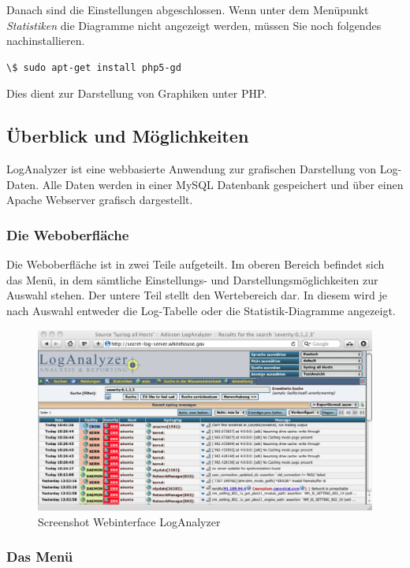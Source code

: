 Danach sind die Einstellungen abgeschlossen. Wenn unter dem Menüpunkt \textit{Statistiken} die Diagramme nicht angezeigt werden, müssen Sie noch folgendes nachinstallieren.

\begin{lstlisting}
\$ sudo apt-get install php5-gd
\end{lstlisting}

Dies dient zur Darstellung von Graphiken unter PHP.

\subsection{Überblick und Möglichkeiten}
LogAnalyzer ist eine webbasierte Anwendung zur grafischen Darstellung von Log-Daten. Alle Daten werden in einer MySQL Datenbank gespeichert und über einen Apache Webserver grafisch dargestellt.

\subsubsection{Die Weboberfläche}
Die Weboberfläche ist in zwei Teile aufgeteilt. Im oberen Bereich befindet sich das Menü, in dem sämtliche Einstellungs- und Darstellungsmöglichkeiten zur Auswahl stehen.
Der untere Teil stellt den Wertebereich dar. In diesem wird je nach Auswahl entweder die Log-Tabelle oder die Statistik-Diagramme angezeigt.

\begin{figure}[h]
\begin{center}
 \includegraphics[width=\textwidth]{content/images/loganalyzer.eps}
  \caption{Screenshot Webinterface LogAnalyzer}
\end{center}
\end{figure}

\subsubsection{Das Menü}
